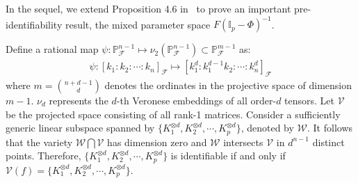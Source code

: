 \documentclass[10pt]{article}
\numberwithin{figure}{section}
\begin{document}
In the sequel, we extend Proposition 4.6 in~\citep{wang_identifiability_2024} to prove an important pre-identifiability result, the mixed parameter space $F(\mathbb{I}_{p}-\Phi)^{-1}$. 

\begin{alemma}\label{intersect}  
    Define a rational map $\psi: \mathbb{P}_
    {\mathcal{F}}^{n-1}\mapsto \nu_2(\mathbb{P}_
    {\mathcal{F}}^{n-1})\subset{\mathbb{P}_
    {\mathcal{F}}^{m-1}}$ as:
    \begin{align}
       \psi: [k_{1}:k_{2}:\cdots:k_{n}]_
    {\mathcal{F}} \mapsto [k_1^d: k_1^{d-1}k_2:\cdots:k_n^{d}]_
    {\mathcal{F}}
    \end{align}
    where $m= \binom{n+d-1}{d}$ denotes the ordinates in the projective space of dimension $m-1$. $\nu_d$ represents the $d$-th Veronese embeddings of all order-$d$ tensors. Let $\mathcal{V}$ be the projected space consisting of all rank-1 matrices. Consider a sufficiently generic linear subspace spanned by $\{K_1^{\otimes d},K_2^{\otimes d},\cdots,K_p^{\otimes d}\}$, denoted by $\mathcal{W}$. It follows that the variety $\mathcal{W}\bigcap \mathcal{V}$ has dimension zero and $\mathcal{W}$ intersects $\mathcal{V}$ in $d^{n-1}$ distinct points. Therefore, $\{K_1^{\otimes d},K_2^{\otimes d},\cdots,K_p^{\otimes d}\}$ is identifiable if and only if $\mathcal{V}(f) = \{K_1^{\otimes d},K_2^{\otimes d},\cdots,K_p^{\otimes d}\}$.
\end{alemma}
\end{document}
